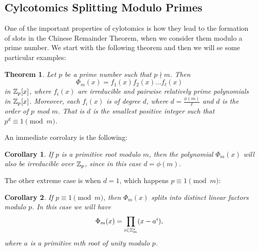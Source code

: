 \documentclass[12pt]{article}
\theoremstyle{plain}
\newtheorem{corollary}{Corollary}
\newtheorem{theorem}{Theorem}
\theoremstyle{definition}
\theoremstyle{remark}
\begin{document}
\subsection{Cylcotomics Splitting Modulo Primes}
One of the important properties of cylotomics is how they lead to the formation of slots in the Chinese Remainder Theorem, when we consider them modulo a prime number. We start with the following theorem and then we will se some particular examples:
\begin{theorem}
Let $p$ be a prime number such that $p\nmid m$. Then 
$$\Phi_m(x) = f_1(x)f_2(x)\dots f_{\ell}(x)$$
in $\mathbb{Z}_p[x]$, where $f_i(x)$ are irreducible and pairwise relatively prime polynomials in $\mathbb{Z}_p[x]$. Moreover, each $f_i(x)$ is of degree $d$, where $d=\frac{\phi(m)}{\ell}$ and $d$ is the order of $p$ mod $m$. That is $d$ is the smallest positive integer such that $p^d\equiv 1\pmod{m}$.  
\end{theorem}
An immediate corrolary is the following:
\begin{corollary}
 If $p$ is a primitive root modulo $m$, then the polynomial $\Phi_m(x)$ will also be irreducible over $\mathbb{Z}_p$, since in this case $d=\phi(m)$. 
\end{corollary}
The other extreme case is when $d=1$, which happens $p\equiv 1 \pmod{m}$:
\begin{corollary}
If $p \equiv 1 \pmod{m}$, then $\Phi_{m}(x)$ splits into distinct linear factors modulo $p$. In this case we will have $$\Phi_m(x) = \prod_{i\in \mathbb{Z}_m^*}(x-a^i),$$
where $a$ is a primitive $m$th root of unity modulo $p$. 
\end{corollary}
\end{document}
